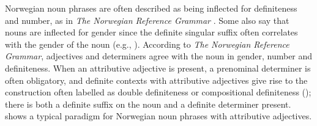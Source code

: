 \documentclass[output=paper,colorlinks,citecolor=brown,modfonts,nonflat]{../langscibook}
\begin{document}
Norwegian noun phrases are often described as being inflected for definiteness and number, as in \textit{The Norwegian Reference Grammar} \citep{FaarlundEtAl1997}. Some also say that nouns are inflected for gender since the definite singular suffix often correlates with the gender of the noun (e.g., \citealt{JohannessenLarsson2015}). According to \textit{The Norwegian Reference Grammar}, adjectives and determiners agree with the noun in gender, number and definiteness. When an attributive adjective is present, a prenominal determiner is often obligatory, and definite contexts with attributive adjectives give rise to the construction often labelled as double definiteness or compositional definiteness (\citealt{Julien2005,Baal2018}); there is both a definite suffix on the noun and a definite determiner present.  shows a typical paradigm for Norwegian noun phrases with attributive adjectives.
\end{document}

